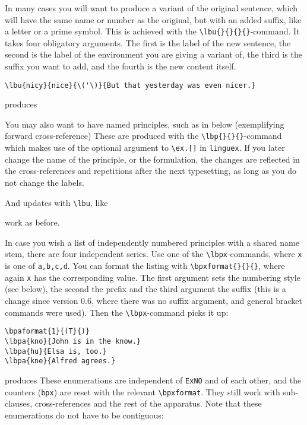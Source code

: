 \documentclass[10pt]{article}
\begin{document}
In many cases you will want to produce a variant of the original sentence, which will have the same name or number as the original, but with an added suffix, like a letter or a prime symbol. This is achieved with the \verb+\lbu{}{}{}{}+-command. It takes four obligatory arguments. The first is the label of the new sentence, the second is the label of the environment you are giving a variant of, the third is the suffix you want to add, and the fourth is the new content itself.
\begin{verbatim}
\lbu{nicy}{nice}{\('\)}{But that yesterday was even nicer.}
\end{verbatim}
produces 

You may also want to  have named principles, such as in  below  (exemplifying forward cross-reference) \bron
{}
These are produced with the \verb+\lbp{}{}{}+-command which makes use of the optional argument to \verb+\ex.[]+ in \verb+linguex+. If you later change the name of the principle, or the formulation, the changes are reflected in the cross-references and repetitions after the next typesetting, as long as you do not change the labels.

And updates with \verb+\lbu+, like
 
work as before.

In case you  wish a list of independently numbered principles with a shared name stem, there are four independent series. Use one  of the \verb+\lbpx+-commands, where \verb+x+ is one of \verb+a,b,c,d+. You can format the listing with \verb+\bpxformat{}{}{}+, where again \verb+x+ has the corresponding value. The first argument sets the numbering style (see below), the second the prefix and the third argument the suffix (this is a change since version 0.6, where there was no suffix argument, and general bracket commands were used).
	 Then the \verb+\lbpx+-command picks it up: 

\begin{verbatim}
\bpaformat{1}{(T}{)}
\lbpa{kno}{John is in the know.} 
\lbpa{hu}{Elsa is, too.} 
\lbpa{kne}{Alfred agrees.} 
\end{verbatim}
produces
These enumerations are independent of \verb+ExNO+ and of each other, and the counters (\verb+bpx+) are reset with the relevant \verb+\bpxformat+.
	 They still work with sub-clauses, cross-references and the rest of the apparatus. Note that these enumerations do not have to be contiguous: 
\end{document}
